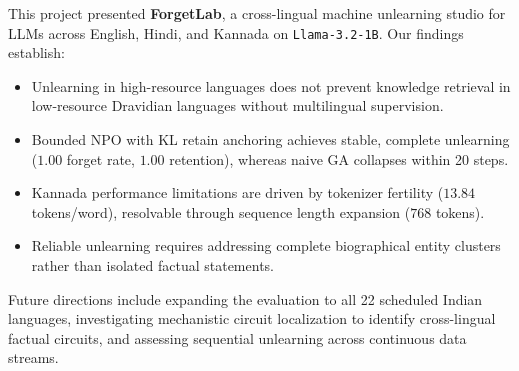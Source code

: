 \documentclass[11pt,a4paper]{article}
\begin{document}
This project presented \textbf{ForgetLab}, a cross-lingual machine unlearning studio for LLMs across English, Hindi, and Kannada on \texttt{Llama-3.2-1B}. Our findings establish:
\begin{itemize}
    \item Unlearning in high-resource languages does not prevent knowledge retrieval in low-resource Dravidian languages without multilingual supervision.
    \item Bounded NPO with KL retain anchoring achieves stable, complete unlearning ($1.00$ forget rate, $1.00$ retention), whereas naive GA collapses within 20 steps.
    \item Kannada performance limitations are driven by tokenizer fertility ($13.84$ tokens/word), resolvable through sequence length expansion ($768$ tokens).
    \item Reliable unlearning requires addressing complete biographical entity clusters rather than isolated factual statements.
\end{itemize}

Future directions include expanding the evaluation to all 22 scheduled Indian languages, investigating mechanistic circuit localization to identify cross-lingual factual circuits, and assessing sequential unlearning across continuous data streams.
\end{document}

